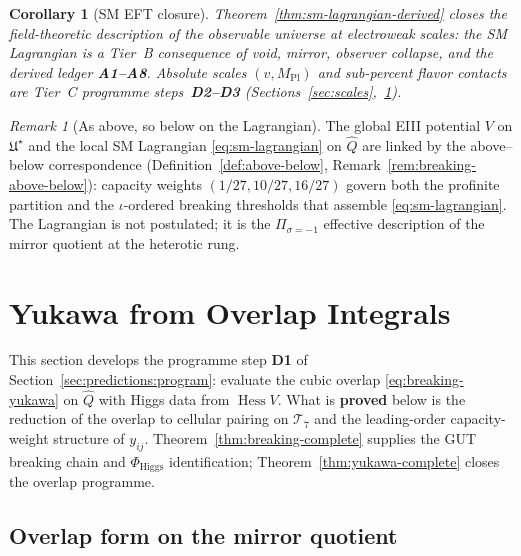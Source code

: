 \documentclass[11pt]{article}
\theoremstyle{plain}
\newtheorem{corollary}[theorem]{Corollary}
\theoremstyle{definition}
\theoremstyle{remark}
\newtheorem{remark}[theorem]{Remark}
\numberwithin{equation}{section}
\newcommand{\MPl}{M_{\mathrm{Pl}}}
\newcommand{\Hess}{\operatorname{Hess}}
\begin{document}
\begin{corollary}[SM EFT closure]
\label{cor:sm-lagrangian-closure}
Theorem~\ref{thm:sm-lagrangian-derived} closes the \emph{field-theoretic}
description of the observable universe at electroweak scales: the SM
Lagrangian is a Tier~B consequence of void, mirror, observer collapse, and the
derived ledger \textbf{A1--A8}. Absolute scales $(v,\MPl)$ and sub-percent
flavor contacts are Tier~C programme steps~\textbf{D2--D3}
(Sections~\ref{sec:scales},~\ref{sec:yukawa}).
\end{corollary}

\begin{remark}[As above, so below on the Lagrangian]
The global EIII potential $V$ on $\mathfrak{U}^\star$ and the local SM
Lagrangian \eqref{eq:sm-lagrangian} on $\hat Q$ are linked by the
above--below correspondence (Definition~\ref{def:above-below},
Remark~\ref{rem:breaking-above-below}): capacity weights
$(1/27,10/27,16/27)$ govern both the profinite partition and the
$\iota$-ordered breaking thresholds that assemble \eqref{eq:sm-lagrangian}.
The Lagrangian is not postulated; it is the $\Pi_{\sigma=-1}$ effective
description of the mirror quotient at the heterotic rung.
\end{remark}%
\section{Yukawa from Overlap Integrals}
\label{sec:yukawa}

This section develops the programme step \textbf{D1} of
Section~\ref{sec:predictions:program}: evaluate the cubic overlap
\eqref{eq:breaking-yukawa} on $\hat Q$ with Higgs data from $\Hess V$.
What is \textbf{proved} below is the reduction of the overlap to cellular
pairing on $\mathcal{T}_7$ and the leading-order capacity-weight structure of
$y_{ij}$. Theorem~\ref{thm:breaking-complete} supplies the GUT breaking chain and
$\Phi_{\mathrm{Higgs}}$ identification; Theorem~\ref{thm:yukawa-complete}
closes the overlap programme.

\subsection{Overlap form on the mirror quotient}
\label{sec:yukawa:overlap}
\end{document}
